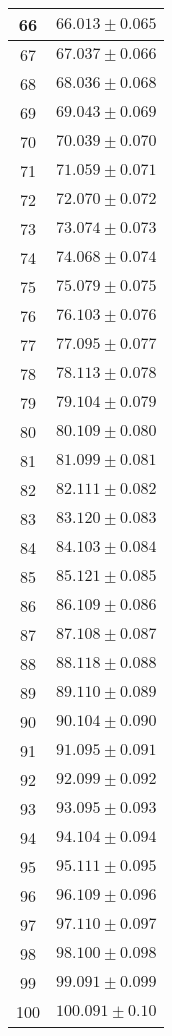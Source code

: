 \documentclass[prb,12pt]{revtex4-2}
\theoremstyle{definition}
\theoremstyle{definition}
\begin{document}
\begin{longtable}{cc}
	66 & $66.013\pm 0.065$ \\\midrule
	67 & $67.037\pm 0.066$ \\\midrule
	68 & $68.036\pm 0.068$ \\\midrule
	69 & $69.043\pm 0.069$ \\\midrule
	70 & $70.039\pm 0.070$ \\\midrule
	71 & $71.059\pm 0.071$ \\\midrule
	72 & $72.070\pm 0.072$ \\\midrule
	73 & $73.074\pm 0.073$ \\\midrule
	74 & $74.068\pm 0.074$ \\\midrule
	75 & $75.079\pm 0.075$ \\\midrule
	76 & $76.103\pm 0.076$ \\\midrule
	77 & $77.095\pm 0.077$ \\\midrule
	78 & $78.113\pm 0.078$ \\\midrule
	79 & $79.104\pm 0.079$ \\\midrule
	80 & $80.109\pm 0.080$ \\\midrule
	81 & $81.099\pm 0.081$ \\\midrule
	82 & $82.111\pm 0.082$ \\\midrule
	83 & $83.120\pm 0.083$ \\\midrule
	84 & $84.103\pm 0.084$ \\\midrule
	85 & $85.121\pm 0.085$ \\\midrule
	86 & $86.109\pm 0.086$ \\\midrule
	87 & $87.108\pm 0.087$ \\\midrule
	88 & $88.118\pm 0.088$ \\\midrule
	89 & $89.110\pm 0.089$ \\\midrule
	90 & $90.104\pm 0.090$ \\\midrule
	91 & $91.095\pm 0.091$ \\\midrule
	92 & $92.099\pm 0.092$ \\\midrule
	93 & $93.095\pm 0.093$ \\\midrule
	94 & $94.104\pm 0.094$ \\\midrule
	95 & $95.111\pm 0.095$ \\\midrule
	96 & $96.109\pm 0.096$ \\\midrule
	97 & $97.110\pm 0.097$ \\\midrule
	98 & $98.100\pm 0.098$ \\\midrule
	99 & $99.091\pm 0.099$ \\\midrule
	100 & $100.091\pm 0.10$ \\\midrule

\end{longtable}
\end{document}
